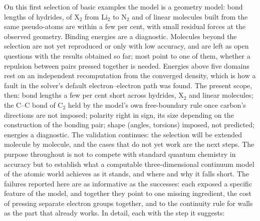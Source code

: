 \documentclass[11pt]{article}
\begin{document}
On this first selection of basic examples the model is a geometry model: bond lengths of hydrides,
of X$_2$ from Li$_2$ to N$_2$ and of linear molecules built from the same pseudo-atoms are within a few
per cent, with small residual forces at the observed geometry. Binding energies are a diagnostic.
Molecules beyond the selection are not yet reproduced or only with low accuracy, and are left as open
questions with the results obtained so far; most point to one of them, whether a repulsion between pairs
pressed together is needed. Energies above five domains rest on an independent recomputation from the
converged density, which is how a fault in the solver's default electron--electron path was found.
The present scope, then: bond lengths a few per cent short across hydrides, X$_2$ and linear molecules;
the C--C bond of C$_2$ held by the model's own free-boundary rule once carbon's directions are not imposed;
polarity right in sign, its size depending on the construction of the bonding pair; shape (angles,
torsions) imposed, not predicted; energies a diagnostic. The validation continues: the selection will be
extended molecule by molecule, and the cases that do not yet work are the next steps. The purpose throughout is not to compete with standard
quantum chemistry in accuracy but to establish what a computable three-dimensional continuum model of the
atomic world achieves as it stands, and where and why it falls short. The failures reported here are as informative as the successes: each exposed a specific
feature of the model, and together they point to one missing ingredient, the cost of pressing separate electron
groups together, and to the continuity rule for walls as the part that already works. In detail, each with the step it suggests:
\end{document}
